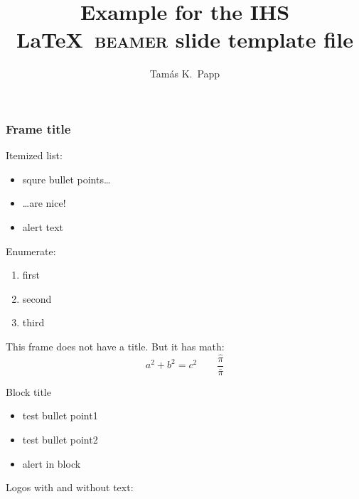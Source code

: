 \documentclass{beamer}
\begin{document}
\title[Short title]{Example for the IHS \LaTeX\ \textsc{beamer} slide template file}
\author[Tam\'as]{Tam\'as K.~Papp}

\begin{frame}[plain]
  \titlepage
\end{frame}

\begin{frame}
  \frametitle{Frame title}

  Itemized list:

  \begin{itemize}
  \item squre bullet points\dots
  \item \dots are nice!
  \item \alert{alert text}
  \end{itemize}

  \bigskip
  
  Enumerate:

  \begin{enumerate}
  \item first
  \item second
  \item third
  \end{enumerate}

\end{frame}

\begin{frame}
  This frame does not have a title.  But it has math:
  \begin{equation*}
    a^2+b^2=c^2 \qquad \frac{\hat\pi}{\bar\pi}
  \end{equation*}

  \begin{block}{Block title}
    \begin{itemize}
    \item test bullet point1
    \item test bullet point2
    \item \alert{alert in block}
    \end{itemize}
  \end{block}

  \bigskip

  Logos with and without text:
  \begin{center}
    \IHSlogotext[height=2em] \hspace{2em} \IHSlogo[height=2em]
  \end{center}
\end{frame}
\end{document}
